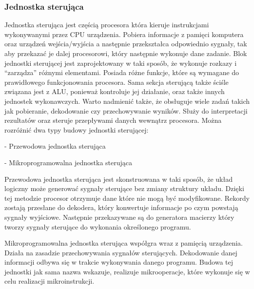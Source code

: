 \documentclass[12pt, a4paper, onside, polish]{article}				%
\begin{document}
\subsubsection{Jednostka sterująca}
\hspace{\parindent}
Jednostka sterująca jest częścią procesora która kieruje instrukcjami wykonywanymi przez CPU urządzenia. Pobiera informacje z pamięci komputera oraz urządzeń wejścia/wyjścia a następnie przekształca odpowiednio sygnały, tak aby przekazać je dalej procesorowi, który następnie wykonuje dane zadanie. Blok jednostki sterującej jest zaprojektowany w taki sposób, że wykonuje rozkazy i “zarządza” różnymi elementami. Posiada różne funkcje, które są wymagane do prawidłowego funkcjonowania procesora. Sama sekcja sterującą także ściśle związana jest z ALU, ponieważ kontroluje jej działanie, oraz także innych jednostek wykonawczych. Warto nadmienić także, że obsługuje wiele zadań takich jak pobieranie, dekodowanie czy przechowywanie wyników. Służy do interpretacji rezultatów oraz steruje przepływami danych wewnątrz procesora. 
\newline\newline
	Można rozróżnić dwa typy budowy jednostki sterującej: 
 
- Przewodowa jednostka sterująca 

- Mikroprogramowalna jednostka sterująca\newline

 

Przewodowa jednostka sterująca jest skonstruowana w taki sposób, że układ logiczny może generować sygnały sterujące bez zmiany struktury układu. Dzięki tej metodzie procesor otrzymuje dane które nie mogą być modyfikowane. Rekordy zostają przesłane do dekodera, który konwertuje informacje po czym powstają sygnały wyjściowe. Następnie przekazywane są do generatora macierzy który tworzy sygnały sterujące do wykonania określonego programu. \newline

 

Mikroprogramowalna jednostka sterująca współgra wraz z pamięcią urządzenia. Działa na zasadzie przechowywania sygnałów sterujących. Dekodowanie danej informacji odbywa się w trakcie wykonywania danego programu. Budowa tej jednostki jak sama nazwa wskazuje, realizuje mikrooperacje, które wykonuje się w celu realizacji mikroinstrukcji.  
\cleardoublepage
\end{document}
